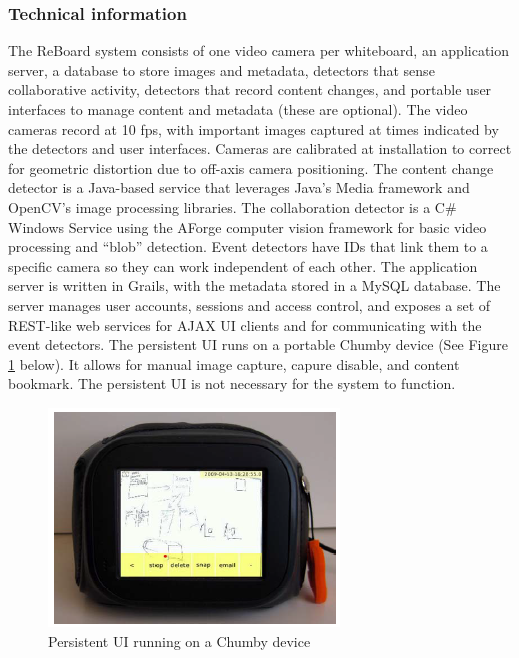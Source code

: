 \documentclass{article}
\begin{document}
	\subsubsection*{Technical information}
The ReBoard system consists of one video camera per whiteboard, an application server, a database to store images and metadata, detectors that sense collaborative activity, detectors that record content changes, and portable user interfaces to manage content and metadata (these are optional).  The video cameras record at 10 fps, with important images captured at times indicated by the detectors and user interfaces.  Cameras are calibrated at installation to correct for geometric distortion due to off-axis camera positioning.  The content change detector is a Java-based service that leverages Java's Media framework and OpenCV's image processing libraries.  The collaboration detector is a C\# Windows Service using the AForge computer vision framework for basic video processing and ``blob'' detection.  Event detectors have IDs that link them to a specific camera so they can work independent of each other.  The application server is written in Grails, with the metadata stored in a MySQL database.  The server manages user accounts, sessions and access control, and exposes a set of REST-like web services for AJAX UI clients and for communicating with the event detectors. The persistent UI runs on a portable Chumby device (See Figure \ref{fig:research_reboard_4} below). \cite{chumby}  It allows for manual image capture, capure disable, and content bookmark.  The persistent UI is not necessary for the system to function.

\begin{figure}[H]
\centering
\includegraphics[scale=1]{images/research_reboard_4}
\caption{Persistent UI running on a Chumby device}
\label{fig:research_reboard_4}
\end{figure}
\end{document}
